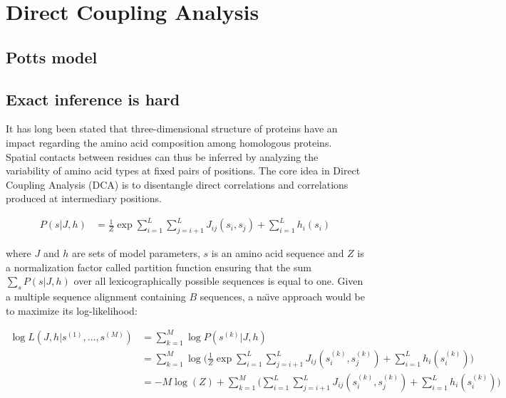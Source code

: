 \section{Direct Coupling Analysis}

    \subsection{Potts model} \label{potts}

        

    \subsection{Exact inference is hard}

        It has long been stated that three-dimensional structure of proteins have an impact regarding the amino acid composition among
        homologous proteins. Spatial contacts between residues can thus be inferred by analyzing the variability of amino acid types at fixed pairs of positions.
        The core idea in Direct Coupling Analysis (DCA) is to disentangle direct correlations and correlations produced at intermediary positions.

        \begin{equation}
            \begin{split}
                P(s \vert J, h) & = \frac{1}{Z} \exp{\sum\limits_{i=1}^L \sum\limits_{j=i+1}^L J_{ij}(s_i, s_j) + \sum\limits_{i=1}^L h_i(s_i)}
            \end{split}
        \end{equation}

        where $J$ and $h$ are sets of model parameters, $s$ is an amino acid sequence and $Z$ is a normalization factor called partition function ensuring
        that the sum $\sum\limits_{s} P(s \vert J, h)$ over all lexicographically possible sequences is equal to one.
        Given a multiple sequence alignment containing $B$ sequences, a na\"\i ve approach would be to maximize its log-likelihood:

        \begin{equation}
            \begin{split}
                \log{L}(J, h \vert s^{(1)}, \dotsc, s^{(M)}) & = \sum\limits_{k=1}^M \log P(s^{(k)} \vert J, h) \\
                & = \sum\limits_{k=1}^M \log \Bigg( \frac{1}{Z} \exp{\sum\limits_{i=1}^L 
                    \sum\limits_{j=i+1}^L J_{ij}(s_i^{(k)}, s_j^{(k)}) + \sum\limits_{i=1}^L h_i(s_i^{(k)})} \Bigg) \\
                & = -M \log(Z) + \sum\limits_{k=1}^M \Big( \sum\limits_{i=1}^L \sum\limits_{j=i+1}^L J_{ij}(s_i^{(k)}, s_j^{(k)}) 
                    + \sum\limits_{i=1}^L h_i(s_i^{(k)}) \Big)
            \end{split}
        \end{equation}

